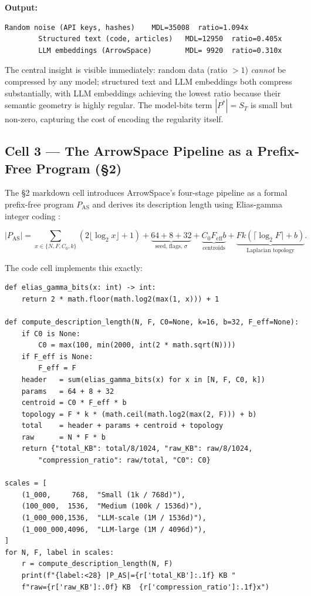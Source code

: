 \documentclass[12pt,a4paper]{article}
\theoremstyle{plain}
\theoremstyle{definition}
\theoremstyle{remark}
\newcommand{\1}{\mathbf{1}}
\begin{document}
	\noindent\textbf{Output:}
	\begin{lstlisting}[numbers=none, backgroundcolor=\color{white},
		frame=none]
		Random noise (API keys, hashes)    MDL=35008  ratio=1.094x
		Structured text (code, articles)   MDL=12950  ratio=0.405x
		LLM embeddings (ArrowSpace)        MDL= 9920  ratio=0.310x
	\end{lstlisting}
	
	The central insight is visible immediately: random data (ratio $>1$)
	\emph{cannot} be compressed by any model; structured text and LLM
	embeddings both compress substantially, with LLM embeddings achieving
	the lowest ratio because their semantic geometry is highly regular.
	The model-bits term $|P^*|=S_T$ is small but non-zero, capturing the
	cost of encoding the regularity itself.
	
	\subsection{Cell 3 --- The ArrowSpace Pipeline as a Prefix-Free Program (§2)}
	
	The §2 markdown cell introduces ArrowSpace's four-stage pipeline as a
	formal prefix-free program $P_\mathrm{AS}$ and derives its description
	length using Elias-gamma integer coding \citep{GrunwaldMDL}:
	
	\begin{equation}
		\label{eq:pas}
		|P_\mathrm{AS}|
		= \sum_{x\in\{N,F,C_0,k\}}\!\!(2\lfloor\log_2 x\rfloor+1)
		+ \underbrace{64+8+32}_{\text{seed, flags, }\sigma}
		+ \underbrace{C_0 F_\mathrm{eff} b}_{\text{centroids}}
		+ \underbrace{F k(\lceil\log_2 F\rceil + b)}_{\text{Laplacian topology}}.
	\end{equation}
	
	The code cell implements this exactly:
	
	\begin{lstlisting}[caption={Description length of the ArrowSpace program},
		label={lst:desclength}]
def elias_gamma_bits(x: int) -> int:
	return 2 * math.floor(math.log2(max(1, x))) + 1
		
def compute_description_length(N, F, C0=None, k=16, b=32, F_eff=None):
	if C0 is None:
		C0 = max(100, min(2000, int(2 * math.sqrt(N))))
	if F_eff is None:
		F_eff = F
	header   = sum(elias_gamma_bits(x) for x in [N, F, C0, k])
	params   = 64 + 8 + 32
	centroid = C0 * F_eff * b
	topology = F * k * (math.ceil(math.log2(max(2, F))) + b)
	total    = header + params + centroid + topology
	raw      = N * F * b
	return {"total_KB": total/8/1024, "raw_KB": raw/8/1024,
		"compression_ratio": raw/total, "C0": C0}
		
scales = [
	(1_000,     768,  "Small (1k / 768d)"),
	(100_000,  1536,  "Medium (100k / 1536d)"),
	(1_000_000,1536,  "LLM-scale (1M / 1536d)"),
	(1_000_000,4096,  "LLM-large (1M / 4096d)"),
]
for N, F, label in scales:
	r = compute_description_length(N, F)
	print(f"{label:<28} |P_AS|={r['total_KB']:.1f} KB "
	f"raw={r['raw_KB']:.0f} KB  {r['compression_ratio']:.1f}x")
	\end{lstlisting}
	
\end{document}
